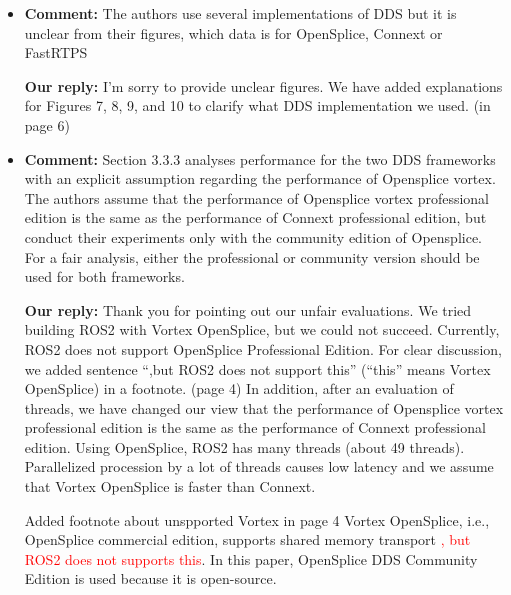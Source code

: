\documentclass{article}
\begin{document}
\begin{itemize}
  \begin{flushleft}
    \textbf{Our reply:} Thank you for pointing out our wrong part. We have fulfilled Tabel 5 legend as ``Comparison of ROS2 to Related Work''. (in page 9)
  \end{flushleft}

\item \begin{flushleft}
  \textbf{Comment:} The authors use several implementations of DDS but it is unclear from their figures, which data is for OpenSplice, Connext or FastRTPS
\end{flushleft}

  \begin{flushleft}
    \textbf{Our reply:} I'm sorry to provide unclear figures. We have added explanations for Figures 7, 8, 9, and 10 to clarify what DDS implementation we used. (in page 6)
  \end{flushleft}

\item \begin{flushleft}
  \textbf{Comment:} Section 3.3.3 analyses performance for the two DDS frameworks with an explicit assumption regarding the performance of Opensplice vortex. The authors assume that the performance of Opensplice vortex professional edition is the same as the performance of Connext professional edition, but conduct their experiments only with the community edition of Opensplice. For a fair analysis, either the professional or community version should be used for both frameworks.
\end{flushleft}

  \begin{flushleft}
    \textbf{Our reply:} Thank you for pointing out our unfair evaluations. 
    We tried building ROS2 with Vortex OpenSplice, but we could not succeed. 
    Currently, ROS2 does not support OpenSplice Professional Edition. For clear discussion, we added sentence ``,but ROS2 does not support this'' (``this'' means Vortex OpenSplice) in a footnote. (page 4)
    In addition, after an evaluation of threads, we have changed our view that the performance of Opensplice vortex professional edition is the same as the performance of Connext professional edition. 
    Using OpenSplice, ROS2 has many threads (about 49 threads). 
    Parallelized procession by a lot of threads causes low latency and we assume that Vortex OpenSplice is faster than Connext.
  \end{flushleft}
  \begin{itembox}[|]{Added footnote about unspported Vortex in page 4}
    Vortex OpenSplice, i.e., OpenSplice commercial edition, supports shared memory transport \textcolor{red}{, but ROS2 does not supports this}. In this paper, OpenSplice DDS Community Edition is used because it is open-source.
  \end{itembox}\\
  
\end{itemize}
\end{document}
